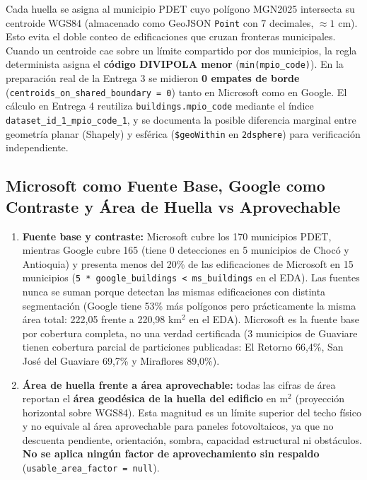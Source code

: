 \documentclass[11pt, a4paper]{article}
\begin{document}
Cada huella se asigna al municipio PDET cuyo polígono MGN2025 intersecta su centroide WGS84 (almacenado como GeoJSON \texttt{Point} con 7 decimales, $\approx 1$ cm). Esto evita el doble conteo de edificaciones que cruzan fronteras municipales. Cuando un centroide cae sobre un límite compartido por dos municipios, la regla determinista asigna el \textbf{código DIVIPOLA menor} (\texttt{min(mpio\_code)}). En la preparación real de la Entrega 3 se midieron \textbf{0 empates de borde} (\texttt{centroids\_on\_shared\_boundary = 0}) tanto en Microsoft como en Google. El cálculo en Entrega 4 reutiliza \texttt{buildings.mpio\_code} mediante el índice \texttt{dataset\_id\_1\_mpio\_code\_1}, y se documenta la posible diferencia marginal entre geometría planar (Shapely) y esférica (\texttt{\$geoWithin} en \texttt{2dsphere}) para verificación independiente.

\subsection{Microsoft como Fuente Base, Google como Contraste y Área de Huella vs Aprovechable}

\begin{enumerate}
    \item \textbf{Fuente base y contraste:} Microsoft cubre los 170 municipios PDET, mientras Google cubre 165 (tiene 0 detecciones en 5 municipios de Chocó y Antioquia) y presenta menos del 20\% de las edificaciones de Microsoft en 15 municipios (\texttt{5 * google\_buildings < ms\_buildings} en el EDA). Las fuentes nunca se suman porque detectan las mismas edificaciones con distinta segmentación (Google tiene 53\% más polígonos pero prácticamente la misma área total: 222,05 frente a 220,98 km$^2$ en el EDA). Microsoft es la fuente base por cobertura completa, no una verdad certificada (3 municipios de Guaviare tienen cobertura parcial de particiones publicadas: El Retorno 66,4\%, San José del Guaviare 69,7\% y Miraflores 89,0\%).
    \item \textbf{Área de huella frente a área aprovechable:} todas las cifras de área reportan el \textbf{área geodésica de la huella del edificio} en m$^2$ (proyección horizontal sobre WGS84). Esta magnitud es un límite superior del techo físico y no equivale al área aprovechable para paneles fotovoltaicos, ya que no descuenta pendiente, orientación, sombra, capacidad estructural ni obstáculos. \textbf{No se aplica ningún factor de aprovechamiento sin respaldo} (\texttt{usable\_area\_factor = null}).
\end{enumerate}
\end{document}
